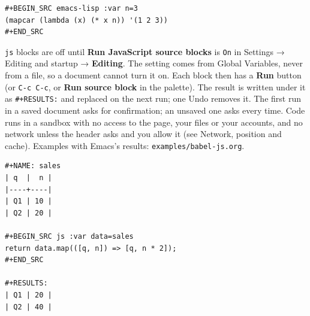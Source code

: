 \documentclass[11pt]{article}
\begin{document}
\begin{verbatim}
#+BEGIN_SRC emacs-lisp :var n=3
(mapcar (lambda (x) (* x n)) '(1 2 3))
#+END_SRC
\end{verbatim}

\texttt{js} blocks are off until \textbf{Run JavaScript source blocks} is \texttt{On} in Settings → Editing and startup → \textbf{Editing}. The setting comes from Global Variables, never from a file, so a document cannot turn it on. Each block then has a \textbf{Run} button (or \texttt{C-c C-c}, or \textbf{Run source block} in the palette). The result is written under it as \texttt{\#+RESULTS:} and replaced on the next run; one Undo removes it. The first run in a saved document asks for confirmation; an unsaved one asks every time. Code runs in a sandbox with no access to the page, your files or your accounts, and no network unless the header asks and you allow it (see Network, position and cache). Examples with Emacs's results: \texttt{examples/babel-js.org}.

\begin{verbatim}
#+NAME: sales
| q  |  n |
|----+----|
| Q1 | 10 |
| Q2 | 20 |

#+BEGIN_SRC js :var data=sales
return data.map(([q, n]) => [q, n * 2]);
#+END_SRC

#+RESULTS:
| Q1 | 20 |
| Q2 | 40 |
\end{verbatim}
\end{document}

